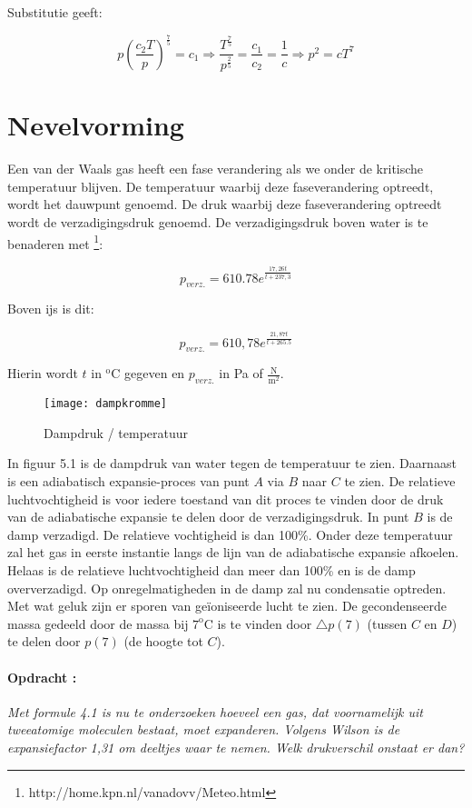 Substitutie geeft:

\begin{equation}
p\left(\frac{c_{2}T}{p}\right)^{\frac{7}{5}}=c_{1}
\Rightarrow\frac{T^{\frac{7}{5}}}{p^{\frac{2}{5}}}=\frac{c_{1}}{c_{2}}=\frac{1}{c}
\Rightarrow p^{2}=cT^{7}
\end{equation}



\section{Nevelvorming}

Een van der Waals gas heeft een fase verandering als we onder de kritische
tempera\-tuur blijven. De tempera\-tuur waarbij deze faseverandering
optreedt, wordt het dauwpunt genoemd. De druk waarbij deze faseverandering
optreedt wordt de verzadigingsdruk genoemd. De verzadigingsdruk boven
water is te benaderen met \footnote{http://home.kpn.nl/vanadovv/Meteo.html}:

\begin{equation}
p_{verz.}=610.78e^{\frac{17,26t}{t+237,3}}
\end{equation}


Boven ijs is dit:

\begin{equation}
p_{verz.}=610,78e^{\frac{21,87t}{t+265.5}}
\end{equation}


Hierin wordt $t$ in $\mathrm{^{o}C}$ gegeven en $p_{verz.}$ in
Pa of $\frac{\mathrm{N}}{\mathrm{m}^{2}}$.

\begin{figure}[h]
\noindent \begin{centering}
\texttt{[image: dampkromme]}
\par\end{centering}

\caption{Dampdruk / temperatuur}
\end{figure}


In figuur 5.1 is de dampdruk van water tegen de temperatuur te zien.
Daarnaast is een adiabatisch expansie-proces van punt $A$ via $B$
naar $C$ te zien. De relatieve luchtvochtigheid is voor iedere toestand
van dit proces te vinden door de druk van de adiabatische expansie
te delen door de verzadigingsdruk. In punt $B$ is de damp verzadigd.
De relatieve vochtigheid is dan 100\%. Onder deze temperatuur zal
het gas in eerste instantie langs de lijn van de adiabatische expansie
afkoelen. Helaas is de relatieve luchtvochtigheid dan meer dan 100\%
en is de damp oververzadigd. Op onregelmatigheden in de damp zal nu
condensatie optreden. Met wat geluk zijn er sporen van geïoniseerde
lucht te zien. De gecondenseerde massa gedeeld door de massa bij $\mathrm{7^{o}C}$
is te vinden door $\triangle p(7)$ (tussen $C$ en $D$) te delen
door $p(7)$ (de hoogte tot $C$). 


\paragraph*{Opdracht :}

\emph{Met formule 4.1 is nu te onderzoeken hoeveel een gas, dat voornamelijk
uit tweeatomige moleculen bestaat, moet expanderen. Volgens Wilson
is de expansiefactor 1,31 om deeltjes waar te nemen. Welk drukverschil
onstaat er dan?}


